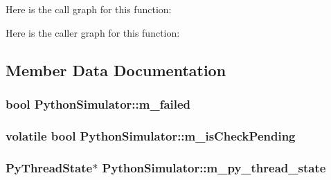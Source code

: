 Here is the call graph for this function\+:




Here is the caller graph for this function\+:




\subsection{Member Data Documentation}
\subsubsection[{\texorpdfstring{m\+\_\+failed}{m_failed}}]{\setlength{\rightskip}{0pt plus 5cm}bool Python\+Simulator\+::m\+\_\+failed\hspace{0.3cm}{\ttfamily [private]}}\hypertarget{classPythonSimulator_a85d760df5c63546c6dcd4f563af64440}{}\label{classPythonSimulator_a85d760df5c63546c6dcd4f563af64440}
\subsubsection[{\texorpdfstring{m\+\_\+is\+Check\+Pending}{m_isCheckPending}}]{\setlength{\rightskip}{0pt plus 5cm}volatile bool Python\+Simulator\+::m\+\_\+is\+Check\+Pending\hspace{0.3cm}{\ttfamily [private]}}\hypertarget{classPythonSimulator_a39dd069b57b7646e9ce951796b845c49}{}\label{classPythonSimulator_a39dd069b57b7646e9ce951796b845c49}
\subsubsection[{\texorpdfstring{m\+\_\+py\+\_\+thread\+\_\+state}{m_py_thread_state}}]{\setlength{\rightskip}{0pt plus 5cm}Py\+Thread\+State$\ast$ Python\+Simulator\+::m\+\_\+py\+\_\+thread\+\_\+state\hspace{0.3cm}{\ttfamily [private]}}\hypertarget{classPythonSimulator_a8753254ac25b9e483f20b237d4b3b85c}{}\label{classPythonSimulator_a8753254ac25b9e483f20b237d4b3b85c}
